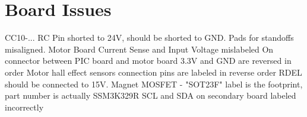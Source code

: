 \documentclass{article}
\begin{document}

\section{Board Issues}
CC10-...
RC Pin shorted to 24V, should be shorted to GND.
Pads for standoffs misaligned.
Motor Board Current Sense and Input Voltage mislabeled
On connector between PIC board and motor board 3.3V and GND are reversed in order
Motor hall effect sensors connection pins are labeled in reverse order
RDEL should be connected to 15V. 
Magnet MOSFET - "SOT23F" label is the footprint, part number is actually SSM3K329R
SCL and SDA on secondary board labeled incorrectly
\end{document}
